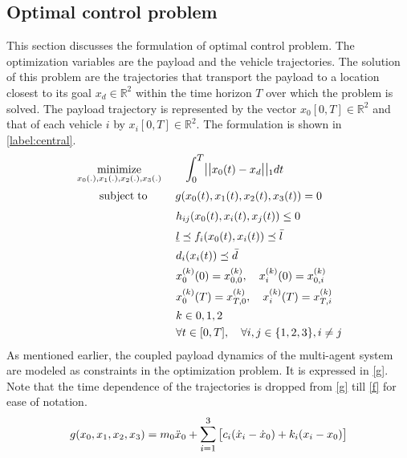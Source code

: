 \documentclass[letterpaper, 10 pt, conference]{ieeeconf}
\newcommand{\ubar}[1]{\text{\b{$#1$}}}
\DeclareMathOperator*{\minimize}{minimize}
\DeclareMathOperator*{\subj}{subject\;to}
\begin{document}
\subsection{Optimal control problem}
This section discusses the formulation of optimal control problem. The optimization variables are the payload and the vehicle trajectories. The solution of this problem are the trajectories that transport the payload to a location closest to its goal $x_d \in \mathbb{R}^2$ within the time horizon $T$ over which the problem is solved.
The payload trajectory is represented by the vector ${x_0[0,T] \in \mathbb{R}^2}$ and that of each vehicle $i$ by ${x_i[0,T] \in \mathbb{R}^2}$.
 The formulation is shown in \eqref{label:central}.
\begin{equation}
  \label{label:central}
  \begin{aligned}
    & \minimize_{x_0(.),x_1(.),x_2(.),x_3(.)} \qquad \mathlarger{\int_0^T} \mathlarger{||}x_0(t)-x_d\mathlarger{||}_1 dt \\
    & \qquad \subj
     \qquad \text{  } g(x_0(t),x_1(t),x_2(t),x_3(t)) = 0 \\
    &	\qquad  \qquad \qquad \quad \quad \quad h_{ij}(x_0(t),x_i(t),x_j(t)) \leq 0 \\
    &	\qquad  \qquad \qquad \quad \quad \quad \ubar{l} \preceq f_i(x_0(t),x_i(t)) \preceq \bar{l}\\   
    &	\qquad  \qquad \qquad \quad \quad \quad d_i(x_i(t)) \preceq \bar{d} \\
    &	\qquad  \qquad \qquad \quad \quad \quad x_0^{(k)}(0) = x_{0,0}^{(k)}, \quad x_i^{(k)}(0) = x_{0,i}^{(k)} \\
       &	 \qquad \qquad \qquad \quad \quad \quad x_0^{(k)}(T) = x_{T,0}^{(k)} , \quad x_i^{(k)}(T) = x_{T,i}^{(k)} \\
       &	 \qquad \qquad \qquad \quad \quad \quad k\in{0,1,2} \\
    &	 \qquad \qquad \qquad \quad \quad \quad \forall t \in [0,T], \quad \forall i,j \in \{1,2,3\}, i \neq j
  \end{aligned}
\end{equation}
As mentioned earlier, the coupled payload dynamics of the multi-agent system are modeled as constraints in the optimization problem. It is expressed in \eqref{g}. Note that the time dependence of the trajectories is dropped from \eqref{g} till \eqref{f} for ease of notation.
\begin{equation}\label{g}
\begin{aligned}
g(x_0,x_1,x_2,x_3) &= m_0\ddot{x}_0 +  \mathlarger{\sum\limits_{i=1}^{3}}
\begin{bmatrix}{c_i(\dot{x}_i-\dot{x}_0) + k_i(x_i - x_0)} \end{bmatrix}\\
\end{aligned}
\end{equation}
\end{document}
